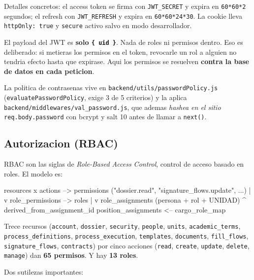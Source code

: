 \documentclass[11pt,a4paper,oneside]{report}
\newcommand{\rt}[1]{\texttt{#1}}
\begin{document}
Detalles concretos: el access token se firma con \rt{JWT\_SECRET} y expira en
\rt{60*60*2} segundos; el refresh con \rt{JWT\_REFRESH} y expira en \rt{60*60*24*30}. La
cookie lleva \rt{httpOnly: true} y \rt{secure} activo salvo en modo desarrollador.

El payload del JWT es \textbf{solo \rt{\{ uid \}}}. Nada de roles ni permisos dentro. Eso es
deliberado: si metieras los permisos en el token, revocarle un rol a alguien no tendria efecto
hasta que expirase. Aqui los permisos se resuelven \textbf{contra la base de datos en cada
peticion}.

La politica de contrasenas vive en \rt{backend/utils/passwordPolicy.js}
(\rt{evaluatePasswordPolicy}, exige 3 de 5 criterios) y la aplica
\rt{backend/middlewares/val\_password.js}, que ademas \emph{hashea en el sitio}
\rt{req.body.password} con bcrypt y salt 10 antes de llamar a \rt{next()}.

\subsection{Autorizacion (RBAC)}

RBAC son las siglas de \emph{Role-Based Access Control}, control de acceso basado en roles.
El modelo es:

\begin{diagrama}
resources x actions  -->  permissions ("dossier.read", "signature_flows.update", ...)
                                |
                                v
                          role_permissions  -->  roles
                                                   |
                                                   v
                                            role_assignments (persona + rol + UNIDAD)
                                                   ^ derived_from_assignment_id
                                            position_assignments  <--  cargo_role_map
\end{diagrama}

Trece recursos (\rt{account}, \rt{dossier}, \rt{security}, \rt{people}, \rt{units},
\rt{academic\_terms}, \rt{process\_definitions}, \rt{process\_execution}, \rt{templates},
\rt{documents}, \rt{fill\_flows}, \rt{signature\_flows}, \rt{contracts}) por cinco acciones
(\rt{read}, \rt{create}, \rt{update}, \rt{delete}, \rt{manage}) dan \textbf{65 permisos}. Y hay
\textbf{13 roles}.

Dos sutilezas importantes:
\end{document}
